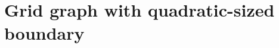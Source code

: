 \documentclass[11pt,a4paper]{amsart}
\newcommand{\tp}[1]{{\left( #1 \right)}}
\newcommand{\abs}[1]{\ensuremath{\left\vert#1\right\vert}}
\theoremstyle{definition}
\theoremstyle{remark}
\begin{document}
%

\section{Grid graph with quadratic-sized boundary}\label{sec:quadratic-boundary}
\end{document}

